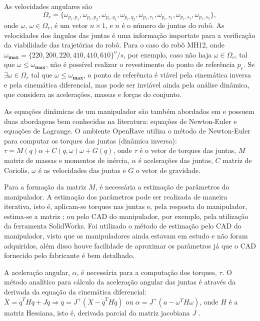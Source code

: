 As velocidades angulares são $$\Omega_r
=
\{\omega_{p_r,p_1},\omega_{p_r,p_2},\omega_{p_r,q_1},\omega_{p_r,q_2},\omega_{p_r,r_1},\omega_{p_r,r_2},\omega_{p_r,s_1},\omega_{p_r,s_2}\},$$
onde $\omega$, $\omega\in\Omega_r$, é um vetor $n \times 1$, e $n$ é o número de
juntas do robô. As velocidades dos ângulos das juntas é uma informação importate para a
verificação da viabilidade das trajetórias do robô. Para o caso do robô
MH12, onde $\omega_{\textbf{max}}=\{220, 200, 220, 410, 410, 610\}^o/s$, por
exemplo, caso não haja $\omega\in\Omega_r$, tal que
$\omega\leq\omega_{\textbf{max}}$, não é possível realizar o revestimento do
ponto de referência $p_r$. Se $\exists \omega\in\Omega_r$ tal que
$\omega\leq\omega_{\textbf{max}}$, o ponto de referência é viável pela
cinemática inversa e pela cinemática diferencial, mas pode ser inviável ainda
pela análise dinâmica, que considera as acelerações, massas e forças do
conjunto.

As equações dinâmicas de um manipulador são também abordados em
\cite{sciavicco2000differential} e possuem duas abordagens bem conhecidas na
literatura: equações de Newton-Euler e equações de Lagrange. O ambiente OpenRave
utiliza o método de Newton-Euler para computar os torques das juntas (dinâmica
inversa): $\tau = M(q)\alpha + C(q,\omega)\omega + G(q) $, onde $\tau$ é o
vetor de torques das juntas, $M$ matriz de massas e momentos de inércia,
$\alpha$ é acelerações das juntas, $C$ matriz de Coriolis, $\omega$ é as
velocidades das juntas e $G$ o vetor de gravidade.

Para a formação da matriz $M$, é necessária a estimação de parâmetros do
manipulador. A estimação dos parâmetros pode ser realizada de maneira iterativa,
isto é, aplicam-se torques nas juntas e, pela resposta
do manipulador, estima-se a matriz \citep{slotine1988adaptive}; ou pelo CAD do
manipulador, por exemplo, pela utilização da ferramenta SolidWorks. Foi utilizado o método de estimação pelo CAD do
manipulador, visto que os manipuladores ainda estavam em estudo e não foram
adquiridos, além disso houve facilidade de aproximar os parâmetros já que o CAD
fornecido pelo fabricante é bem detalhado. 

A aceleração angular, $\alpha$, é necessária para a computação dos torques,
$\tau$. O método analítico para cálculo da aceleração angular das juntas é
através da derivada da equação da cinemática diferencial:
$\ddot{X}=\dot{q}^TH\dot{q}+J\ddot{q} \Rightarrow
\ddot{q}=J^+(\ddot{X}-\dot{q}^TH\dot{q})$ ou
$\alpha=J^+(a-\omega^TH\omega)$, onde $H$ é a matriz Hessiana, isto é, derivada
parcial da matriz jacobiana $J$ \citep{hourtash2005kinematic}. 

